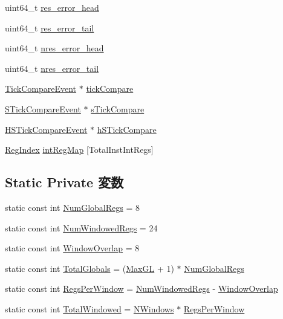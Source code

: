 \begin{DoxyCompactItemize}
\item 
uint64\_\-t \hyperlink{classSparcISA_1_1ISA_a82458e32f522aa74099e9d613b09af6e}{res\_\-error\_\-head}
\item 
uint64\_\-t \hyperlink{classSparcISA_1_1ISA_a1133915920bc64289d3eb90df5f9f8fd}{res\_\-error\_\-tail}
\item 
uint64\_\-t \hyperlink{classSparcISA_1_1ISA_a821c065349acec659246d605e9677a19}{nres\_\-error\_\-head}
\item 
uint64\_\-t \hyperlink{classSparcISA_1_1ISA_a6067e91b1e4fa5d14b645f673b8052d3}{nres\_\-error\_\-tail}
\item 
\hyperlink{classCpuEventWrapper}{TickCompareEvent} $\ast$ \hyperlink{classSparcISA_1_1ISA_ac35cd2e6db9b53a961d7c27b5ddb06e2}{tickCompare}
\item 
\hyperlink{classCpuEventWrapper}{STickCompareEvent} $\ast$ \hyperlink{classSparcISA_1_1ISA_aa6afa0d89310534cbe845f9450f7f7f3}{sTickCompare}
\item 
\hyperlink{classCpuEventWrapper}{HSTickCompareEvent} $\ast$ \hyperlink{classSparcISA_1_1ISA_a98fc67c7d29f456770395ec06f5e7959}{hSTickCompare}
\item 
\hyperlink{namespaceSparcISA_a69329e1d929a534ff51be6cf8216b69a}{RegIndex} \hyperlink{classSparcISA_1_1ISA_a56cee90834264b564effd9a3d9f46c3e}{intRegMap} \mbox{[}TotalInstIntRegs\mbox{]}
\end{DoxyCompactItemize}
\subsection*{Static Private 変数}
\begin{DoxyCompactItemize}
\item 
static const int \hyperlink{classSparcISA_1_1ISA_abd837d1660a059e15c481b15de81245e}{NumGlobalRegs} = 8
\item 
static const int \hyperlink{classSparcISA_1_1ISA_a9d358d98321735bfa556505af1ffd32b}{NumWindowedRegs} = 24
\item 
static const int \hyperlink{classSparcISA_1_1ISA_aca1beb46289722aec38d4b6c230d6d50}{WindowOverlap} = 8
\item 
static const int \hyperlink{classSparcISA_1_1ISA_a0022a569233296cddbcb0862a16a0f06}{TotalGlobals} = (\hyperlink{namespaceSparcISA_af56470bc16dfc33549217225934bcd23}{MaxGL} + 1) $\ast$ \hyperlink{classSparcISA_1_1ISA_abd837d1660a059e15c481b15de81245e}{NumGlobalRegs}
\item 
static const int \hyperlink{classSparcISA_1_1ISA_ae0502aa41dafc203f8470512a2ca6fe8}{RegsPerWindow} = \hyperlink{classSparcISA_1_1ISA_a9d358d98321735bfa556505af1ffd32b}{NumWindowedRegs} -\/ \hyperlink{classSparcISA_1_1ISA_aca1beb46289722aec38d4b6c230d6d50}{WindowOverlap}
\item 
static const int \hyperlink{classSparcISA_1_1ISA_afbaca3bf9771df45107bf33d834e3108}{TotalWindowed} = \hyperlink{namespaceSparcISA_a6216686abfee3750d491873b95a05308}{NWindows} $\ast$ \hyperlink{classSparcISA_1_1ISA_ae0502aa41dafc203f8470512a2ca6fe8}{RegsPerWindow}
\end{DoxyCompactItemize}


